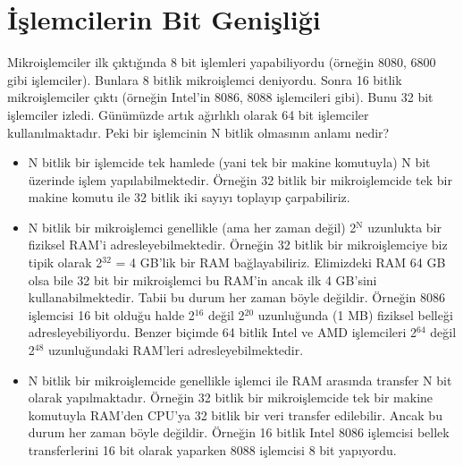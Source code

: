 \documentclass[letterpaper,10pt,turkish]{sphinxmanual}
\begin{document}
\section{İşlemcilerin Bit Genişliği}
\label{\detokenize{introduction:islemcilerin-bit-genisligi}}
\sphinxAtStartPar
Mikroişlemciler ilk çıktığında 8 bit işlemleri yapabiliyordu (örneğin 8080, 6800 gibi işlemciler).
Bunlara 8 bitlik mikroişlemci deniyordu. Sonra 16 bitlik mikroişlemciler çıktı (örneğin Intel’in
8086, 8088 işlemcileri gibi). Bunu 32 bit işlemciler izledi. Günümüzde artık ağırlıklı olarak 64
bit işlemciler kullanılmaktadır. Peki bir işlemcinin N bitlik olmasının anlamı nedir?
\begin{itemize}
\item {} 
\sphinxAtStartPar
{} N bitlik bir işlemcide tek hamlede (yani tek bir makine
komutuyla) N bit üzerinde işlem yapılabilmektedir. Örneğin 32 bitlik bir mikroişlemcide tek
bir makine komutu ile 32 bitlik iki sayıyı toplayıp çarpabiliriz.

\item {} 
\sphinxAtStartPar
{} N bitlik bir mikroişlemci genellikle (ama her zaman
değil) 2$^{\text{N}}$ uzunlukta bir fiziksel RAM’i adresleyebilmektedir. Örneğin 32 bitlik bir
mikroişlemciye biz tipik olarak 2$^{\text{32}}$ = 4 GB’lik bir RAM bağlayabiliriz. Elimizdeki RAM
64 GB olsa bile 32 bit bir mikroişlemci bu RAM’in ancak ilk 4 GB’sini kullanabilmektedir. Tabii
bu durum her zaman böyle değildir. Örneğin 8086 işlemcisi 16 bit olduğu halde 2$^{\text{16}}$
değil 2$^{\text{20}}$ uzunluğunda (1 MB) fiziksel belleği adresleyebiliyordu. Benzer biçimde 64
bitlik Intel ve AMD işlemcileri 2$^{\text{64}}$ değil 2$^{\text{48}}$ uzunluğundaki RAM’leri
adresleyebilmektedir.

\item {} 
\sphinxAtStartPar
{} N bitlik bir mikroişlemcide genellikle işlemci ile RAM
arasında transfer N bit olarak yapılmaktadır. Örneğin 32 bitlik bir mikroişlemcide tek bir
makine komutuyla RAM’den CPU’ya 32 bitlik bir veri transfer edilebilir. Ancak bu durum her
zaman böyle değildir. Örneğin 16 bitlik Intel 8086 işlemcisi bellek transferlerini 16 bit
olarak yaparken 8088 işlemcisi 8 bit yapıyordu.

\end{itemize}
\end{document}

